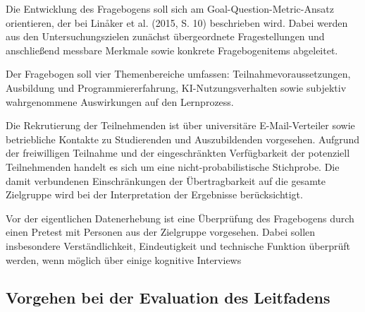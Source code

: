 Die Entwicklung des Fragebogens soll sich am Goal-Question-Metric-Ansatz orientieren, der bei Linåker et al. (2015, S. 10) beschrieben wird. Dabei werden aus den Untersuchungszielen zunächst übergeordnete Fragestellungen und anschließend messbare Merkmale sowie konkrete Fragebogenitems abgeleitet.

Der Fragebogen soll vier Themenbereiche umfassen: Teilnahmevoraussetzungen, Ausbildung und Programmiererfahrung, KI-Nutzungsverhalten sowie subjektiv wahrgenommene Auswirkungen auf den Lernprozess.

Die Rekrutierung der Teilnehmenden ist über universitäre E-Mail-Verteiler sowie betriebliche Kontakte zu Studierenden und Auszubildenden vorgesehen. Aufgrund der freiwilligen Teilnahme und der eingeschränkten Verfügbarkeit der potenziell Teilnehmenden handelt es sich um eine nicht-probabilistische Stichprobe. Die damit verbundenen Einschränkungen der Übertragbarkeit auf die gesamte Zielgruppe wird bei der Interpretation der Ergebnisse berücksichtigt.

Vor der eigentlichen Datenerhebung ist eine Überprüfung des Fragebogens durch einen Pretest mit Personen aus der Zielgruppe vorgesehen. Dabei sollen insbesondere Verständlichkeit, Eindeutigkeit und technische Funktion überprüft werden, wenn möglich über einige kognitive Interviews

\subsection{Vorgehen bei der Evaluation des Leitfadens}
